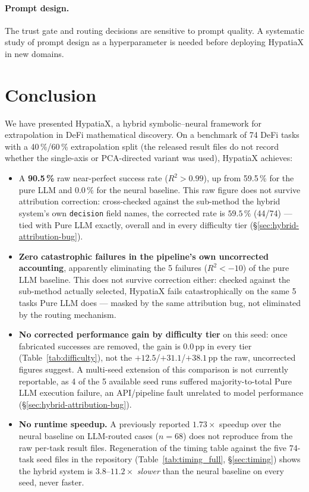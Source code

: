 \documentclass[twoside,11pt]{article}
\newcommand{\Rsq}{R^{2}}
\begin{document}
\paragraph{Prompt design.}
The trust gate and routing decisions are sensitive to prompt quality.  A systematic
study of prompt design as a hyperparameter is needed before deploying HypatiaX
in new domains.

\section{Conclusion}
\label{sec:conclusion}

We have presented HypatiaX, a hybrid symbolic--neural framework for extrapolation
in DeFi mathematical discovery.  On a benchmark of 74 DeFi tasks with a 40\,\%/60\,\% extrapolation split (the released result files do not record whether the single-axis or PCA-directed variant was used), HypatiaX achieves:

\begin{itemize}
  \item A \textbf{90.5\,\%} raw near-perfect success rate ($\Rsq > 0.99$), up from
    59.5\,\% for the pure LLM and 0.0\,\% for the neural baseline. This raw
    figure does not survive attribution correction: cross-checked against the
    sub-method the hybrid system's own \texttt{decision} field names, the
    corrected rate is $59.5\,\%$ (44/74) --- tied with Pure LLM exactly,
    overall and in every difficulty tier (\S\ref{sec:hybrid-attribution-bug}).
  \item \textbf{Zero catastrophic failures in the pipeline's own uncorrected
    accounting}, apparently eliminating the 5 failures ($\Rsq < -10$) of the
    pure LLM baseline. This does not survive correction either: checked
    against the sub-method actually selected, HypatiaX fails catastrophically
    on the same 5 tasks Pure LLM does --- masked by the same attribution bug,
    not eliminated by the routing mechanism.
  \item \textbf{No corrected performance gain by difficulty tier} on this
    seed: once fabricated successes are removed, the gain is $0.0$\,pp in
    every tier (Table~\ref{tab:difficulty}), not the $+12.5$/$+31.1$/$+38.1$\,pp
    the raw, uncorrected figures suggest. A multi-seed extension of this
    comparison is not currently reportable, as 4 of the 5 available seed runs
    suffered majority-to-total Pure LLM execution failure, an API/pipeline
    fault unrelated to model performance (\S\ref{sec:hybrid-attribution-bug}).
  \item \textbf{No runtime speedup.} A previously reported $1.73\times$ speedup
    over the neural baseline on LLM-routed cases ($n=68$) does not reproduce
    from the raw per-task result files. Regeneration
    of the timing table against the five 74-task seed files in the
    repository (Table~\ref{tab:timing_full}, \S\ref{sec:timing}) shows the hybrid
    system is $3.8$--$11.2\times$ \emph{slower} than the neural baseline on
    every seed, never faster.
\end{itemize}
\end{document}
